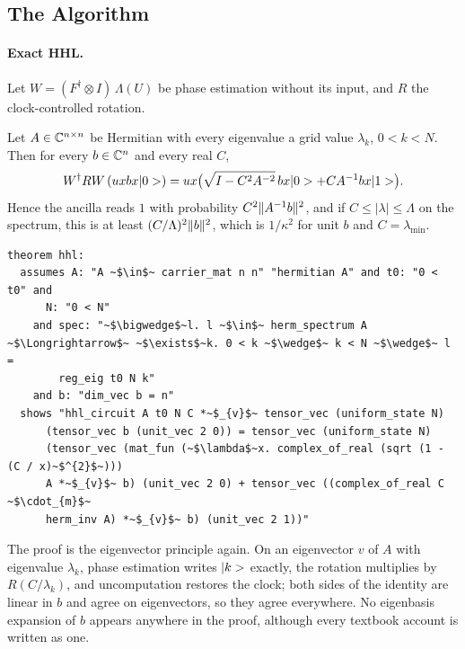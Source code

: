 \subsection{The Algorithm}\label{sec:algorithm}

\paragraph{Exact HHL.} Let $W=(F^\dagger\otimes I)\,\Lambda(U)$ be phase estimation without its
input, and $R$ the clock-controlled rotation.

\begin{theorem}\label{thm:hhl}
Let $A\in\mathbb{C}^{n\times n}$ be Hermitian with every eigenvalue a grid value $\lambda_k$, $0<k<N$. Then
for every $b\in\mathbb{C}^n$ and every real $C$,
\[
W^\dagger RW\,(ux bx|0>)=ux\bigl(\sqrt{I-C^2A^{-2}}\,bx|0>+CA^{-1}bx|1>\bigr).
\]
Hence the ancilla reads $1$ with probability $C^2\|A^{-1}b\|^2$, and if $C\le|\lambda|\le\Lambda$ on
the spectrum, this is at least $(C/\Lambda)^2\|b\|^2$, which is $1/\kappa^2$ for unit
$b$ and $C=\lambda_{\min}$.
\end{theorem}

\begin{lstlisting}[float=tp,caption={Exact HHL as a matrix identity, for every right-hand side},label={lst:hhl}]
theorem hhl:
  assumes A: "A ~$\in$~ carrier_mat n n" "hermitian A" and t0: "0 < t0" and
      N: "0 < N"
    and spec: "~$\bigwedge$~l. l ~$\in$~ herm_spectrum A ~$\Longrightarrow$~ ~$\exists$~k. 0 < k ~$\wedge$~ k < N ~$\wedge$~ l =
        reg_eig t0 N k"
    and b: "dim_vec b = n"
  shows "hhl_circuit A t0 N C *~$_{v}$~ tensor_vec (uniform_state N)
      (tensor_vec b (unit_vec 2 0)) = tensor_vec (uniform_state N)
      (tensor_vec (mat_fun (~$\lambda$~x. complex_of_real (sqrt (1 - (C / x)~$^{2}$~)))
      A *~$_{v}$~ b) (unit_vec 2 0) + tensor_vec ((complex_of_real C ~$\cdot_{m}$~
      herm_inv A) *~$_{v}$~ b) (unit_vec 2 1))"
\end{lstlisting}

The proof is the eigenvector principle again. On an eigenvector $v$ of $A$ with eigenvalue
$\lambda_k$, phase estimation writes $|k>$ exactly, the rotation multiplies by
$R(C/\lambda_k)$, and uncomputation restores the clock; both sides of the identity are linear in $b$
and agree on eigenvectors, so they agree everywhere. No eigenbasis expansion of $b$ appears anywhere
in the proof, although every textbook account is written as one.

